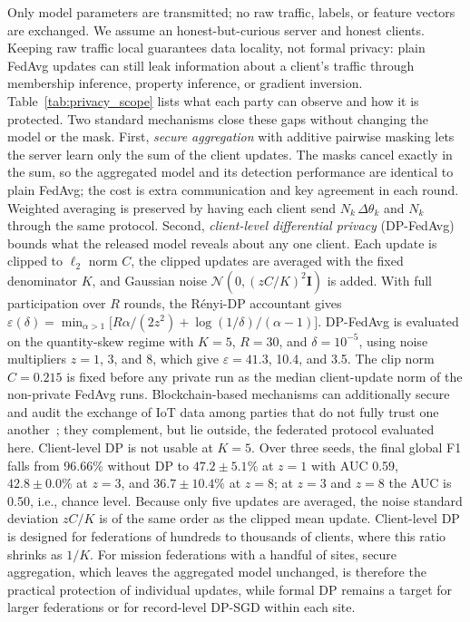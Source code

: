 \documentclass[conference]{IEEEtran}
\begin{document}
Only model parameters are transmitted; no raw traffic, labels,
or feature vectors are exchanged. We assume
an honest-but-curious server and honest clients. Keeping raw traffic
local guarantees data locality, not formal privacy: plain FedAvg
updates can still leak information about a client's traffic through
membership inference, property inference, or gradient inversion.
Table~\ref{tab:privacy_scope} lists what each party can observe and
how it is protected. Two standard mechanisms close these gaps without
changing the model or the mask. First, \textit{secure aggregation}
with additive pairwise masking lets the server learn only the sum of
the client updates. The masks cancel exactly in the sum, so the
aggregated model and its detection performance are identical to plain
FedAvg; the cost is extra communication and key agreement in each
round. Weighted averaging is preserved by having each client send
$N_k\,\Delta\theta_k$ and $N_k$ through the same protocol. Second,
\textit{client-level differential privacy} (DP-FedAvg) bounds what
the released model reveals about any one client. Each update is
clipped to $\ell_2$ norm $C$, the clipped updates are averaged with
the fixed denominator $K$, and Gaussian noise
$\mathcal{N}(0,(zC/K)^2\mathbf{I})$ is added. With full participation
over $R$ rounds, the R\'enyi-DP accountant gives
$\varepsilon(\delta)=\min_{\alpha>1}\bigl[R\alpha/(2z^2)+
\log(1/\delta)/(\alpha-1)\bigr]$. DP-FedAvg is evaluated on the
quantity-skew regime with $K=5$, $R=30$, and $\delta=10^{-5}$, using
noise multipliers $z=1$, 3, and 8, which give $\varepsilon=41.3$,
10.4, and 3.5. The clip norm $C=0.215$ is fixed before any private
run as the median client-update norm of the non-private FedAvg runs.
Blockchain-based mechanisms can additionally secure and audit the
exchange of IoT data among parties that do not fully trust one
another~\cite{amadi2026symmetric}; they complement, but lie outside,
the federated protocol evaluated here.
Client-level DP is not usable at $K=5$. Over
three seeds, the final global F1 falls from 96.66\% without DP to
$47.2\pm5.1\%$ at $z=1$ with AUC 0.59, $42.8\pm0.0\%$ at $z=3$, and
$36.7\pm10.4\%$ at $z=8$; at $z=3$ and $z=8$ the AUC is 0.50, i.e.,
chance level. Because only five updates are averaged, the noise
standard deviation $zC/K$ is of the same order as the clipped mean
update. Client-level DP is designed for federations of hundreds to
thousands of clients, where this ratio shrinks as $1/K$. For mission
federations with a handful of sites, secure aggregation, which leaves
the aggregated model unchanged, is therefore the practical protection
of individual updates, while formal DP remains a target for larger
federations or for record-level DP-SGD within each site.
\end{document}
